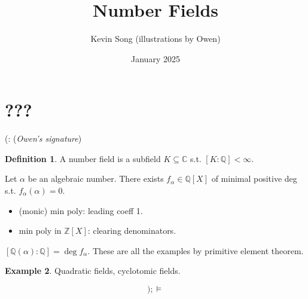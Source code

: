 \documentclass{article}
\title{Number Fields}
\author{Kevin Song (illustrations by Owen)}
\date{January 2025}
\theoremstyle{definition}
\newtheorem{defn}{Definition}[section]
\newtheorem{example}[defn]{Example}
\theoremstyle{remark}
\theoremstyle{plain}
\newcommand{\ZZ}{\mathbb{Z}}
\newcommand{\QQ}{\mathbb{Q}}
\newcommand{\CC}{\mathbb{C}}
\begin{document}
\maketitle
\section{???}
(: (\textit{Owen's signature})




\begin{defn}
    A number field is a subfield $K\subseteq \CC$ s.t. $[K:\QQ]<\infty$.
\end{defn}
Let $\alpha$ be an algebraic number. There exists $f_\alpha\in\QQ[X]$ of minimal positive deg s.t. $f_\alpha(\alpha)=0$. 
\begin{itemize}
    \item (monic) min poly: leading coeff 1.
    \item min poly in $\ZZ[X]$: clearing denominators.
\end{itemize}
$[\QQ(\alpha):\QQ]=\deg f_\alpha$. These are all the examples by primitive element theorem.
\begin{example}
    Quadratic fields, cyclotomic fields. 
\end{example}

\[);\models\tag{Owen's Signature}\]
\end{document}
